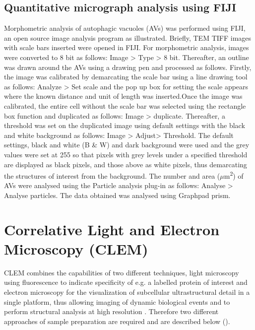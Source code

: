 \subsection{Quantitative micrograph analysis using FIJI}
Morphometric analysis of autophagic vacuoles (AVs) \citep{Kawaoka2017,Swanlund2010} was performed using FIJI, an open source image analysis program as illustrated. Briefly, TEM TIFF images with scale bars inserted were opened in FIJI. For morphometric analysis, images were converted to 8 bit as follows: Image > Type > 8 bit. Thereafter, an outline was drawn around the AVs using a drawing pen and processed as follows. Firstly, the image was calibrated by demarcating the scale bar using a line drawing tool as follows: Analyze > Set scale and the pop up box for setting the scale appears where the known distance and unit of length was inserted.Once the image was calibrated, the entire cell without the scale bar was selected using the rectangle box function and duplicated as follows: Image > duplicate. Thereafter, a threshold was set on the duplicated image using default settings with the black and white background as follows: Image > Adjust> Threshold. The default settings, black and white (B \& W) and dark background were used and the grey values were set at 255 so that pixels with grey levels under a specified threshold are displayed as black pixels, and those above as white pixels, thus demarcating the structures of interest from the background. The number and area ($\mu$m\textsuperscript{2}) of AVs were analysed using the Particle analysis plug-in as follows: Analyse > Analyse particles. The data obtained was analysed using Graphpad prism. 

\section{Correlative Light and Electron Microscopy (CLEM)} 
CLEM combines the capabilities of two different techniques, light microscopy using fluorescence to indicate specificity of e.g. a labelled protein of interest and electron microscopy for the visualization of subcellular ultrastructural detail in a single platform, thus allowing imaging of dynamic biological events and to perform structural analysis at high resolution \citep{Russell2017}. Therefore two different approaches of sample preparation are required and are described below (). 

